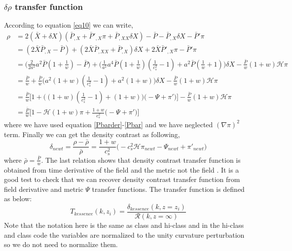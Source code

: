 \documentclass[a4paper,14pt]{article}
\newcommand {\be}{\begin{equation}}
\newcommand {\ee}{\end{equation}}
\begin{document}
\subsubsection{$\delta \rho$ transfer function}
According to equation \ref{eq10} we can write,
\begin{align}
\rho &=2 (\bar{X}+\delta X)(\bar{P}_{,X} +\bar{P}'_{,X} \pi + \bar{P}_{,XX} \delta X)- \bar{P} - \bar{P}_{,X} \delta X -  \bar{P}' \pi\\
\nonumber &
=(2 \bar{X}\bar{P}_{,X}- \bar{P} )+(2 \bar{X}  \bar{P}_{,XX} + \bar{P}_{,X}) \delta X + 2 \bar{X} \bar{P}'_{,X} \pi -\bar{P}' \pi
\nonumber  \\&
=\Big ( \frac{2}{ 2 a^2} a^2 \bar{P} (1+\frac{1}{w})-\bar{P} \Big)+ \Bigg(  \frac{1}{a^2}a^4 \bar{P} (1+\frac{1}{w} )(\frac{1}{c_s^2}-1) + a^2 \bar{P} (\frac{1}{w}+1) \Bigg) \delta X- \frac{\bar{P}}{w} (1+w)\mathcal{H} \pi
\nonumber  \\&
= \frac{\bar{P}}{w}+ \frac{\bar{P}}{w} \Big(  a^2  (1+w) (\frac{1}{c_s^2}-1) + a^2 (1+w) \Big) \delta X-\frac{\bar{P}}{w} (1+w)\mathcal{H} \pi
\nonumber  \\&
= \frac{\bar{P}}{w} \Bigg[1+  \Big( (1+w) (\frac{1}{c_s^2}-1) +  (1+w) \Big) \Big( -\Psi +\pi ' \Big) \Bigg] - \frac{\bar{P}}{w} (1+w)\mathcal{H} \pi
\nonumber
  \\&
= \frac{\bar{P}}{w} \Bigg[1- \mathcal{H} (1+w) \pi+ \frac{1+w}{c_s^2} \Big( -\Psi +\pi ' \Big) \Bigg]
\end{align}
where we have used equation \ref{Pbarder}-\ref{Pbar} and we have neglected $(\nabla \pi)^2$ term.
Finally we can get the density contrast  as following,
\be
\delta_{newt}=\frac{\rho- \bar{\rho}}{\bar{\rho}}=\frac{1+w}{c_s^2} \Big ( -c_s^2 \mathcal{H} \pi_{newt}-\Psi_{newt}+\pi' _{newt}\Big )
\ee
where $\bar{\rho}= \frac{\bar{P}}{w}$. The last relation shows that density contrast transfer function is obtained from time derivative of the field and the metric not the field . It is a good test to check that we can recover density contrast transfer function from field derivative and metric $\Psi$ transfer functions. The transfer function is defined as below:
\be
T_{kessence}(k,z_i)=\frac{\delta_{kessence} (k,z=z_i)}{\mathcal{R}(k,z=\infty)}
\ee
Note that the notation here is the same as class and hi-class and in the hi-class and class code the variables are normalized to the unity curvature perturbation so we do not need to normalize them. \\
\end{document}
